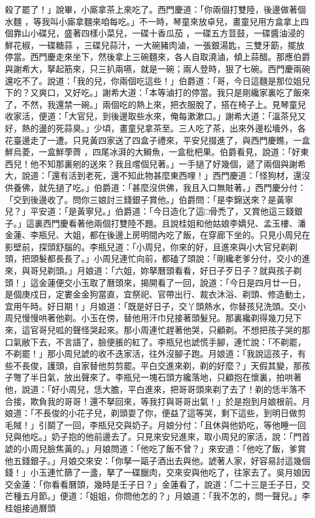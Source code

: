 \begin{showcontents}{}
殺了罷了！」說畢，小廝拿茶上來吃了。西門慶道：「你兩個打雙陸，後邊做著個水麵 ，等我叫小廝拿麵來咱每吃。」不一時，琴童來放卓兒，畫童兒用方盒拿上四個靠山小碟兒，盛著四樣小菜兒，一碟十香瓜茄 ，一碟五方荳鼓，一碟醬油浸的鮮花椒，一碟糖蒜 ，三碟兒蒜汁，一大碗豬肉滷，一張銀湯匙，三雙牙筯，擺放停當。西門慶走來坐下，然後拿上三碗麵來，各人自取澆滷，傾上蒜醋。那應伯爵與謝希大，拏起筋來，只三扒兩嚥，就是一碗；兩人登時，狠了七碗。西門慶兩碗還吃不了。說道：「我的兒，你兩個吃這些！」伯爵道：「哥，今日這麵是那位姐兒下的？又爽口，又好吃。」謝希大道：「本等滷打的停當。我只是剛纔家裏吃了飯來了，不然，我還禁一碗。」兩個吃的熱上來，把衣服脫了，搭在椅子上。見琴童兒收家活，便道：「大官兒，到後邊取些水來，俺每漱漱口。」謝希大道：「溫茶兒又好，熱的盪的死蒜臭。」少頃，畫童兒拿茶至。三人吃了茶，出來外邊松墻外，各花臺邊走了一遭。只見黃四家送了四盒子禮來，平安兒掇進了，與西門慶瞧，一盒鮮烏菱，一盒鮮荸薺 ，四尾冰湃的大鰣魚，一盒枇杷果。伯爵看見，說道：「好東西兒！他不知那裏剜的送來？我且嚐個兒著。」一手撾了好幾個，遞了兩個與謝希大，說道：「還有活到老死，還不知此物甚麼東西哩！」西門慶道：「怪狗材，還沒供養佛，就先撾了吃。」伯爵道：「甚麼沒供佛，我且入口無賍著。」西門慶分付：「交到後邊收了。問你三娘討三錢銀子賞他。」伯爵問：「是李錦送來？是黃寧兒？」平安道：「是黃寧兒。」伯爵道：「今日造化了這□骨禿了，又賞他這三錢銀子。」這裏西門慶看著他兩個打雙陸不題。且說桂姐和他姑娘李嬌兒、孟玉樓、潘金蓮、李瓶兒、大姐，都在後邊上房明間內吃了飯，在穿廊下坐的。只見小周兒在影壁前，探頭舒腦的。李瓶兒道：「小周兒，你來的好，且進來與小大官兒剃剃頭，把頭髮都長長了。」小周兒連忙向前，都磕了頭說：「剛纔老爹分付，交小的進來，與哥兒剃頭。」月娘道：「六姐，妳拏曆頭看看，好日子歹日子？就與孩子剃頭！」這金蓮便交小玉取了曆頭來，揭開看了一回，說道：「今日是四月廿一日，是個庚戍日，定婁金金狗當直，宜祭祀、官帶出行、裁衣沐浴、剃頭、修造動土，宜用午時。好日期！」月娘道：「既是好日子，交丫頭熱水，你替孩兒洗頭。交小周兒慢慢哄著他剃。小玉在傍，替他用汗巾兒接著頭髮兒。那裏纔剃得幾刀兒下來，這官哥兒呱的聲怪哭起來。那小周連忙趕著他哭，只顧剃。不想把孩子哭的那口氣敝下去，不言語了，臉便脹的紅了。李瓶兒也諕慌手腳，連忙說：「不剃罷，不剃罷！」那小周兒諕的收不迭家活，往外沒腳子跑。月娘道：「我說這孩子，有些不長俊，護頭，自家替他剪剪罷。平白交進來剃，剃的好麼？」天假其變，那孩子彆了半日氣，放出聲來了。李瓶兒一塊石頭方纔落地，只顧抱在懷裏，拍哄著他，說道：「好小周兒，恁大膽，平白進來，把哥哥頭來剃了去了！剃的恁半落不合接，欺負我的哥哥！還不拏回來，等我打與哥哥出氣！」於是抱到月娘根前。月娘道：「不長俊的小花子兒，剃頭耍了你，便益了這等哭，剩下這些，到明日做剪毛賊！」引鬬了一回，李瓶兒交與奶子。月娘分付：「且休與他奶吃，等他睡一回兒與他吃。」奶子抱的他前邊去了。只見來安兒進來，取小周兒的家活，說：「門首諕的小周兒臉焦黃的。」月娘問道：「他吃了飯不曾？」來安道：「他吃了飯，爹賞他五錢銀子。」月娘交來安：「你拏一甌子酒出去與他。諕著人家，好容易討這幾個錢！」小玉連忙篩了一盞，拏了一碟臘肉，交來安與他吃了，往家去了。吳月娘因交金蓮：「你看看曆頭，幾時是壬子日？」金蓮看了，說道：「二十三是壬子日，交芒種五月節。」便道：「姐姐，你問他怎的？」月娘道：「我不怎的，問一聲兒。」李桂姐接過曆頭
\end{showcontents}
